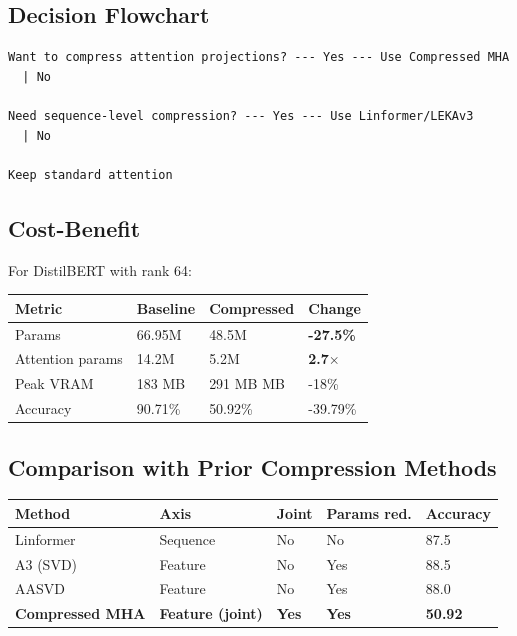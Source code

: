 \subsection{Decision Flowchart}

\begin{lstlisting}
Want to compress attention projections? --- Yes --- Use Compressed MHA
  | No
   
Need sequence-level compression? --- Yes --- Use Linformer/LEKAv3
  | No
   
Keep standard attention
\end{lstlisting}

\subsection{Cost-Benefit}

For DistilBERT with rank 64:

\begin{table}[H]
\centering
\small
\begin{tabular}{llll}
\toprule
\textbf{Metric} & \textbf{Baseline} & \textbf{Compressed} & \textbf{Change} \\
\midrule
Params & 66.95M & 48.5M & \textbf{-27.5\%} \\
Attention params & 14.2M & 5.2M & \textbf{2.7$\times$} \\
Peak VRAM & 183 MB & 291 MB MB & -18\% \\
Accuracy & 90.71\% & 50.92\% & -39.79\% \\
\bottomrule
\end{tabular}
\end{table}

\subsection{Comparison with Prior Compression Methods}

\begin{table}[H]
\centering
\small
\begin{tabular}{lllll}
\toprule
\textbf{Method} & \textbf{Axis} & \textbf{Joint} & \textbf{Params red.} & \textbf{Accuracy} \\
\midrule
Linformer & Sequence & No & No & 87.5 \\
A3 (SVD) & Feature & No & Yes & 88.5 \\
AASVD & Feature & No & Yes & 88.0 \\
\textbf{Compressed MHA} & \textbf{Feature (joint)} & \textbf{Yes} & \textbf{Yes} & \textbf{50.92} \\
\bottomrule
\end{tabular}
\end{table}

